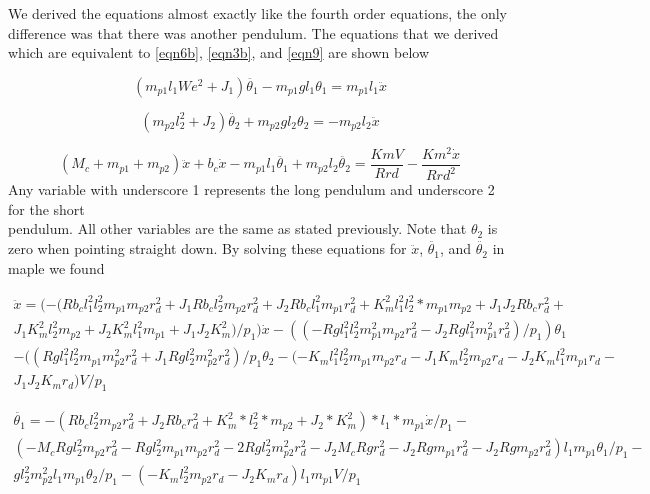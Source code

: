 \documentclass{article}
\begin{document}
We derived the equations almost exactly like the fourth order equations, the only difference was that there was another pendulum. The equations that we derived which are equivalent to \ref{eqn6b}, \ref{eqn3b}, and \ref{eqn9} are shown below

\begin{equation} 
\label{eqn6th1}
(m_{p1} l_1We^2+J_1) \ddot{\theta_1}-m_{p1} g l_1 \theta_1 = m_{p1} l_1 \ddot{x}
\end{equation}

\begin{equation} 
\label{eqn6th2}
(m_{p2} l_2^2+J_2) \ddot{\theta_2}+m_{p2} g l_2 \theta_2 = -m_{p2} l_2 \ddot{x}
\end{equation}

\begin{equation} 
\label{eqn6th3}
(M_c+m_{p1}+m_{p2}) \ddot{x}+b_c \dot{x}-m_{p1} l_1 \ddot{\theta_1}+m_{p2} l_2 \ddot{\theta_2} = \frac{Km V}{R r d}-\frac{Km^2 \dot{x}}{R r d^2}
\end{equation}
Any variable with underscore 1 represents the long pendulum and underscore 2 for the short \\ pendulum. All other variables are the same as stated previously. Note that $\theta_2$ is zero when pointing straight down. By solving these equations for $\ddot{x}$, $\ddot{\theta_1}$, and $\ddot{\theta_2}$ in maple we found

\begin{multline} 
\label{eqn6th4}
\ddot{x} = (-(R b_c l_1^2 l_2^2 m_{p1} m_{p2} r_d^2+J_1 R b_c l_2^2 m_{p2} r_d^2+J_2 R b_c l_1^2 m_{p1} r_d^2+K_m^2 l_1^2 l_2^2*m_{p1} m_{p2}+J_1 J_2 R b_c r_d^2+\\J_1 K_m^2 l_2^2 m_{p2}+J_2 K_m^2 l_1^2 m_{p1}+J_1 J_2 K_m^2)/p_1)\dot{x} -((-R g l_1^2 l_2^2 m_{p1}^2 m_{p2} r_d^2-J_2 R g l_1^2 m_{p1}^2 r_d^2)/p_1)\theta_1 \\-((R g l_1^2 l_2^2 m_{p1} m_{p2}^2 r_d^2+J_1 R g l_2^2 m_{p2}^2 r_d^2)/p_1 \theta_2 -(-K_m l_1^2 l_2^2 m_{p1} m_{p2} r_d-J_1 K_m l_2^2 m_{p2} r_d-J_2 K_m l_1^2 m_{p1} r_d-\\J_1 J_2 K_m r_d) V/p_1
\end{multline}

\begin{multline} 
\label{eqn6th5}
\ddot{\theta_1} = -(R b_c l_2^2 m_{p2} r_d^2+J_2 R b_c r_d^2+K_m^2*l_2^2*m_{p2}+J_2*K_m^2)*l_1*m_{p1} \dot{x}/p_1 -\\(-M_c R g l_2^2 m_{p2} r_d^2-R g l_2^2 m_{p1} m_{p2} r_d^2-2 R g l_2^2 m_{p2}^2 r_d^2-J_2 M_c R g r_d^2-J_2 R g m_{p1} r_d^2-J_2 R g m_{p2} r_d^2) l_1 m_{p1} \theta_1 /p_1-\\g l_2^2 m_{p2}^2 l_1 m_{p1} \theta_2/p_1-(-K_m l_2^2 m_{p2} r_d-J_2 K_m r_d) l_1 m_{p1} V/p_1
\end{multline}
\end{document}
